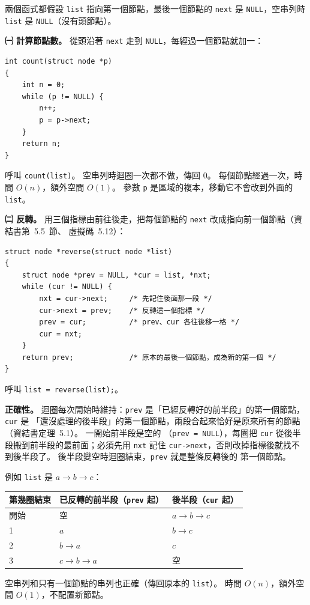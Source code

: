 \begin{pastsoln}
兩個函式都假設 \texttt{list} 指向第一個節點，最後一個節點的 \texttt{next} 是 \texttt{NULL}，空串列時
\texttt{list} 是 \texttt{NULL}（沒有頭節點）。

\textbf{㈠ 計算節點數。} 從頭沿著 \texttt{next} 走到 \texttt{NULL}，每經過一個節點就加一：
\begin{verbatim}
int count(struct node *p)
{
    int n = 0;
    while (p != NULL) {
        n++;
        p = p->next;
    }
    return n;
}
\end{verbatim}
呼叫 \texttt{count(list)}。 空串列時迴圈一次都不做，傳回 $0$。 每個節點經過一次，時間 $O(n)$，額外空間
$O(1)$。 參數 \texttt{p} 是區域的複本，移動它不會改到外面的 \texttt{list}。

\textbf{㈡ 反轉。} 用三個指標由前往後走，把每個節點的 \texttt{next} 改成指向前一個節點（資結書第~5.5~節、
虛擬碼~5.12）：
\begin{verbatim}
struct node *reverse(struct node *list)
{
    struct node *prev = NULL, *cur = list, *nxt;
    while (cur != NULL) {
        nxt = cur->next;     /* 先記住後面那一段 */
        cur->next = prev;    /* 反轉這一個指標 */
        prev = cur;          /* prev、cur 各往後移一格 */
        cur = nxt;
    }
    return prev;             /* 原本的最後一個節點，成為新的第一個 */
}
\end{verbatim}
呼叫 \texttt{list = reverse(list);}。

\textbf{正確性。} 迴圈每次開始時維持：\texttt{prev} 是「已經反轉好的前半段」的第一個節點，\texttt{cur} 是
「還沒處理的後半段」的第一個節點，兩段合起來恰好是原來所有的節點（資結書定理~5.1）。 一開始前半段是空的
（\texttt{prev = NULL}），每圈把 \texttt{cur} 從後半段搬到前半段的最前面；必須先用 \texttt{nxt} 記住
\texttt{cur->next}，否則改掉指標後就找不到後半段了。 後半段變空時迴圈結束，\texttt{prev} 就是整條反轉後的
第一個節點。

例如 \texttt{list} 是 $a \to b \to c$：
\begin{center}
\begin{tabular}{lll}
\toprule
第幾圈結束 & 已反轉的前半段（\texttt{prev} 起） & 後半段（\texttt{cur} 起） \\
\midrule
開始 & 空 & $a \to b \to c$ \\
1 & $a$ & $b \to c$ \\
2 & $b \to a$ & $c$ \\
3 & $c \to b \to a$ & 空 \\
\bottomrule
\end{tabular}
\end{center}
空串列和只有一個節點的串列也正確（傳回原本的 \texttt{list}）。 時間 $O(n)$，額外空間 $O(1)$，不配置新節點。
\end{pastsoln}
